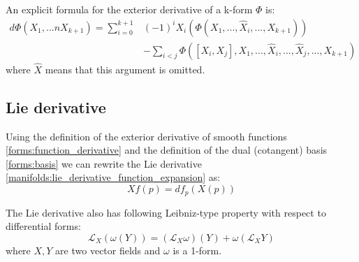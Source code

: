 	\begin{example}
		An explicit formula for the exterior derivative of a k-form $\Phi$ is:
		\begin{align}
			d\Phi(X_1, ...n X_{k+1}) = \sum_{i=0}^{k+1} &(-1)^i X_i(\Phi(X_1, ..., \hat{X}_i, ..., X_{k+1}))\nonumber\\
				\label{forms:k_form_exterior_derivative}
				&-\sum_{i<j} \Phi([X_i, X_j], X_1, ..., \hat{X}_i, ..., \hat{X}_j, ..., X_{k+1})
		\end{align}
		where $\hat{X}$ means that this argument is omitted.
	\end{example}

\subsection{Lie derivative}
	

	\begin{formula}
		Using the definition of the exterior derivative of smooth functions \ref{forms:function_derivative} and the definition of the dual (cotangent) basis \ref{forms:basis} we can rewrite the Lie derivative \ref{manifolds:lie_derivative_function_expansion} as:
		\begin{equation}
			Xf(p)= df_p(X(p))
		\end{equation}
	\end{formula}
	
	\begin{property}
		The Lie derivative also has following Leibniz-type property with respect to differential forms:
		\begin{equation}
			\mathcal{L}_X(\omega (Y)) = (\mathcal{L}_X\omega)(Y) + \omega(\mathcal{L}_XY)
		\end{equation}
		where $X, Y$ are two vector fields and $\omega$ is a 1-form.
	\end{property}
	
	

